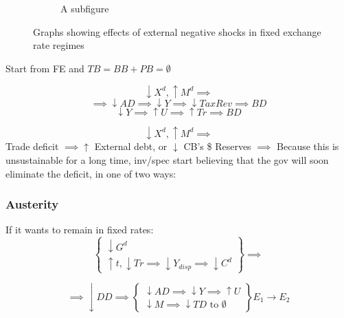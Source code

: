 \documentclass{report}
\begin{document}
\begin{figure}[H]
\begin{subfigure}{.5\textwidth}

  \caption{A subfigure}
  \label{fig:sub2}
\end{subfigure}
\caption{Graphs showing effects of external negative shocks in fixed exchange rate regimes}
\label{fig:test}
\end{figure}




Start from FE and $TB=BB+PB=\emptyset$

$$\downarrow X^d, \uparrow M^d \implies$$
$$ \implies \downarrow AD \implies \downarrow Y \implies \downarrow TaxRev \implies BD$$
$$\downarrow Y \implies \uparrow U \implies \uparrow Tr \implies BD$$

$$\downarrow X^d, \uparrow M^d \implies$$
Trade deficit $\implies \uparrow$ External debt, or $\downarrow$ CB's \$ Reserves $\implies$ Because this is unsustainable for a long time, inv/spec start believing that the gov will soon eliminate the deficit, in one of two ways: 

\subsubsection{Austerity}

If it wants to remain in fixed rates:
$$ \left\{\begin{array}{l}
         \downarrow G^d  \\
          \uparrow t, \downarrow Tr \implies \downarrow Y_{disp} \implies \downarrow C^d
    \end{array} \right\} \implies$$ 
    
    $$ \implies \downarrow DD \implies \left\{\begin{array}{l}
          \downarrow AD \implies \downarrow Y \implies \uparrow U \\
          \downarrow M \implies \downarrow TD \text{ to } \emptyset
    \end{array} \right\}E_1 \rightarrow E_2 $$
\end{document}
